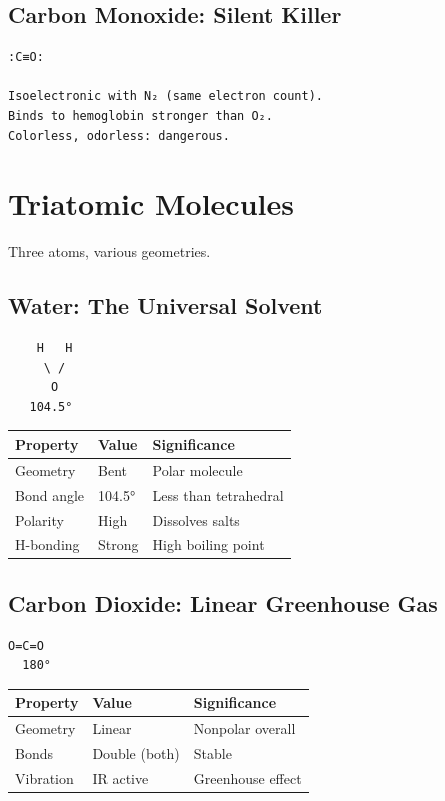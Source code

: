 \documentclass[
  11pt,
  letterpaper,
  twoside,
  openright]{book}
\begin{document}
\subsection{Carbon Monoxide: Silent
Killer}\label{carbon-monoxide-silent-killer}

\begin{verbatim}
:C≡O:

Isoelectronic with N₂ (same electron count).
Binds to hemoglobin stronger than O₂.
Colorless, odorless: dangerous.
\end{verbatim}

\section{Triatomic Molecules}\label{triatomic-molecules}

Three atoms, various geometries.

\subsection{Water: The Universal
Solvent}\label{water-the-universal-solvent}

\begin{verbatim}
    H   H
     \ /
      O
   104.5°
\end{verbatim}

\begin{longtable}[]{@{}lll@{}}
\toprule\noalign{}
Property & Value & Significance \\
\midrule\noalign{}
\endhead
\bottomrule\noalign{}
\endlastfoot
Geometry & Bent & Polar molecule \\
Bond angle & 104.5° & Less than tetrahedral \\
Polarity & High & Dissolves salts \\
H-bonding & Strong & High boiling point \\
\end{longtable}

\subsection{Carbon Dioxide: Linear Greenhouse
Gas}\label{carbon-dioxide-linear-greenhouse-gas}

\begin{verbatim}
O=C=O
  180°
\end{verbatim}

\begin{longtable}[]{@{}lll@{}}
\toprule\noalign{}
Property & Value & Significance \\
\midrule\noalign{}
\endhead
\bottomrule\noalign{}
\endlastfoot
Geometry & Linear & Nonpolar overall \\
Bonds & Double (both) & Stable \\
Vibration & IR active & Greenhouse effect \\
\end{longtable}
\end{document}
